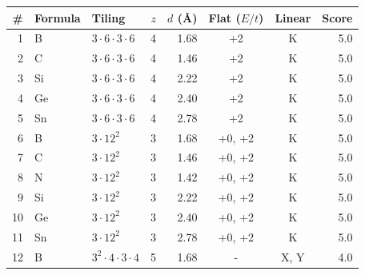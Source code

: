 \begin{tabular}{rllrrccr}
\toprule
\# & Formula & Tiling & $z$ & $d$ (\AA) & Flat ($E/t$) & Linear & Score \\
\midrule
1 & B & $3\!\cdot\!6\!\cdot\!3\!\cdot\!6$ & 4 & 1.68 & +2 & K & 5.0 \\
2 & C & $3\!\cdot\!6\!\cdot\!3\!\cdot\!6$ & 4 & 1.46 & +2 & K & 5.0 \\
3 & Si & $3\!\cdot\!6\!\cdot\!3\!\cdot\!6$ & 4 & 2.22 & +2 & K & 5.0 \\
4 & Ge & $3\!\cdot\!6\!\cdot\!3\!\cdot\!6$ & 4 & 2.40 & +2 & K & 5.0 \\
5 & Sn & $3\!\cdot\!6\!\cdot\!3\!\cdot\!6$ & 4 & 2.78 & +2 & K & 5.0 \\
6 & B & $3\!\cdot\!12^2$ & 3 & 1.68 & +0, +2 & K & 5.0 \\
7 & C & $3\!\cdot\!12^2$ & 3 & 1.46 & +0, +2 & K & 5.0 \\
8 & N & $3\!\cdot\!12^2$ & 3 & 1.42 & +0, +2 & K & 5.0 \\
9 & Si & $3\!\cdot\!12^2$ & 3 & 2.22 & +0, +2 & K & 5.0 \\
10 & Ge & $3\!\cdot\!12^2$ & 3 & 2.40 & +0, +2 & K & 5.0 \\
11 & Sn & $3\!\cdot\!12^2$ & 3 & 2.78 & +0, +2 & K & 5.0 \\
12 & B & $3^2\!\cdot\!4\!\cdot\!3\!\cdot\!4$ & 5 & 1.68 & - & X, Y & 4.0 \\
\bottomrule
\end{tabular}
